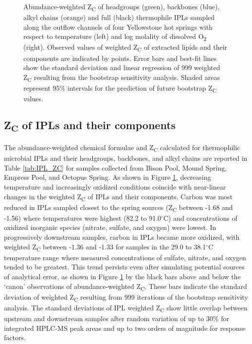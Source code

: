 {\begin{figure}[h]
\begin{subfigure}[b]{0.18\linewidth}
    \end{subfigure}
\caption[Abundance-weighted Z\textsubscript{C} of IPLs and their component parts]{Abundance-weighted Z\textsubscript{C} of headgroups (green), backbones (blue), alkyl chains (orange) and full (black) thermophile IPLs sampled along the outflow channels of four Yellowstone hot springs with respect to temperature (left) and log molality of dissolved O\textsubscript{2} (right). Observed values of weighted Z\textsubscript{C} of extracted lipids and their components are indicated by points. Error bars and best-fit lines show the standard deviation and linear regression of 999 weighted Z\textsubscript{C} resulting from the bootstrap sensitivity analysis. Shaded areas represent 95\% intervals for the prediction of future bootstrap Z\textsubscript{C} values.}
\label{fig:weighted_ZC}
\end{figure}
\doublespace
\clearpage
}

\subsection{Z\textsubscript{C} of IPLs and their components}

The abundance-weighted chemical formulae and Z\textsubscript{C} calculated for thermophilic microbial IPLs and their headgroups, backbones, and alkyl chains are reported in Table \ref{tab:IPL_ZC} for samples collected from Bison Pool, Mound Spring, Empress Pool, and Octopus Spring. As shown in Figure \ref{fig:weighted_ZC}, decreasing temperature and increasingly oxidized conditions coincide with near-linear changes in the weighted Z\textsubscript{C} of IPLs and their components. Carbon was most reduced in IPLs sampled closest to the spring sources (Z\textsubscript{C} between -1.68 and -1.56) where temperatures were highest (82.2 to 91.0$^\circ$C) and concentrations of oxidized inorganic species (nitrate, sulfate, and oxygen) were lowest. In progressively downstream samples, carbon in IPLs became more oxidized, with weighted Z\textsubscript{C} between -1.36 and -1.33 for samples in the 29.0 to 38.1$^\circ$C temperature range where measured concentrations of sulfate, nitrate, and oxygen tended to be greatest. This trend persists even after simulating potential sources of analytical error, as shown in Figure \ref{fig:weighted_ZC} by the black bars above and below the `canon' observations of abundance-weighted Z\textsubscript{C}. These bars indicate the standard deviation of weighted Z\textsubscript{C} resulting from 999 iterations of the bootstrap sensitivity analysis. The standard deviations of IPL weighted Z\textsubscript{C} show little overlap between upstream and downstream samples after random variation of up to 30\% for integrated HPLC-MS peak areas and up to two orders of magnitude for response factors.

